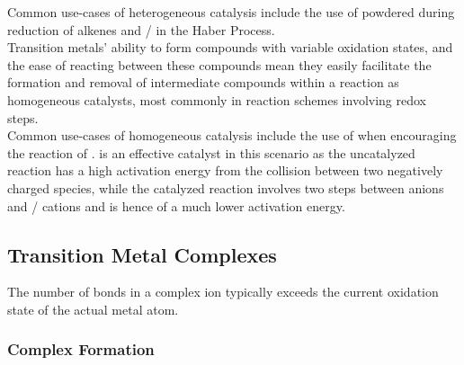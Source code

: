 \documentclass[../main]{subfiles}
\begin{document}
	Common use-cases of heterogeneous catalysis include the use of powdered  during reduction of alkenes and / in the Haber Process. \\

	Transition metals' ability to form compounds with variable oxidation states, and the ease of reacting between these compounds mean they easily facilitate the formation and removal of intermediate compounds within a reaction as homogeneous catalysts, most commonly in reaction schemes involving redox steps. \\

	Common use-cases of homogeneous catalysis include the use of  when encouraging the reaction of .  is an effective catalyst in this scenario as the uncatalyzed reaction has a high activation energy from the collision between two negatively charged species, while the catalyzed reaction involves two steps between anions and / cations and is hence of a much lower activation energy.

	\subsection{Transition Metal Complexes}




	The number of bonds in a complex ion typically exceeds the current oxidation state of the actual metal atom. \\

	\subsubsection{Complex Formation}

	\begin{center}
	\end{center}
\end{document}
